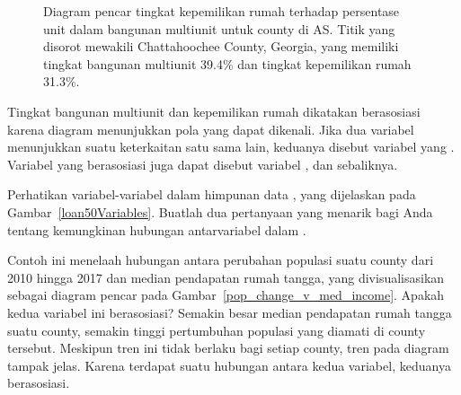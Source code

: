 \begin{figure}[h]
  \centering
  \caption{Diagram pencar tingkat kepemilikan rumah terhadap persentase
      unit dalam bangunan multiunit untuk county di AS.
      Titik yang disorot mewakili Chattahoochee County, Georgia,
      yang memiliki tingkat bangunan multiunit 39.4\% dan tingkat kepemilikan rumah
      31.3\%.}
  \label{multiunitsVsOwnership}
\end{figure}

Tingkat bangunan multiunit dan kepemilikan rumah dikatakan
berasosiasi karena diagram menunjukkan pola yang dapat dikenali.
Jika dua variabel menunjukkan suatu keterkaitan satu sama lain,
keduanya disebut variabel yang .
Variabel yang berasosiasi juga dapat disebut variabel
,
dan sebaliknya.

\D{\newpage}

\begin{exercisewrap}
\begin{nexercise}
Perhatikan variabel-variabel dalam himpunan data ,
yang dijelaskan pada Gambar~\vref{loan50Variables}.
Buatlah dua pertanyaan yang menarik bagi Anda tentang kemungkinan
hubungan antarvariabel dalam .\footnotemark
\end{nexercise}
\end{exercisewrap}

\begin{examplewrap}
\begin{nexample}{Contoh ini menelaah hubungan
    antara perubahan populasi suatu county
    dari 2010 hingga 2017
    dan median pendapatan rumah tangga,
    yang divisualisasikan sebagai diagram pencar pada
    Gambar~\ref{pop_change_v_med_income}.
    Apakah kedua variabel ini berasosiasi?}
  Semakin besar median pendapatan rumah tangga suatu county,
  semakin tinggi pertumbuhan populasi yang diamati di county tersebut.
  Meskipun tren ini tidak berlaku bagi setiap county,
  tren pada diagram tampak jelas.
  Karena terdapat suatu hubungan antara kedua variabel,
  keduanya berasosiasi.
\end{nexample}
\end{examplewrap}

